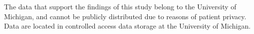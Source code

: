 The data that support the findings of this study belong to the University of Michigan, and cannot be publicly distributed due to reasons of patient privacy. Data are located in controlled access data storage at the University of Michigan.

